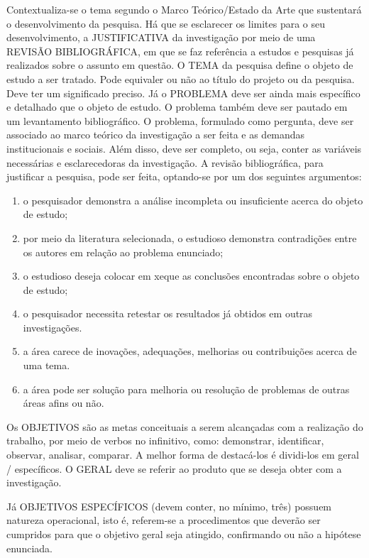 \documentclass[
12pt,				%
openright,			%
oneside,
a4paper,			%
english,			%
french,				%
spanish,			%
brazil,				%
]{abntex2}
\begin{document}
	Contextualiza-se o tema segundo o Marco Teórico/Estado da Arte que sustentará o desenvolvimento da pesquisa. Há que se esclarecer os limites para o seu desenvolvimento, a JUSTIFICATIVA da investigação por meio de uma REVISÃO BIBLIOGRÁFICA, em que se faz referência a estudos e pesquisas já realizados sobre o assunto em questão. O TEMA da pesquisa define o objeto de estudo a ser tratado. Pode equivaler ou não ao título do projeto ou da pesquisa. Deve ter um significado preciso. Já o PROBLEMA deve ser ainda mais específico e detalhado que o objeto de estudo. O problema também deve ser pautado em um levantamento bibliográfico. O problema, formulado como pergunta, deve ser associado ao marco teórico da investigação a ser feita e as demandas institucionais e sociais. Além disso, deve ser completo, ou seja, conter as variáveis necessárias e esclarecedoras da investigação. 
	A revisão bibliográfica, para justificar a pesquisa, pode ser feita, optando-se por um dos seguintes argumentos:
	\begin{enumerate}
		\item o pesquisador demonstra a análise incompleta ou insuficiente acerca do objeto de estudo;
		\item por meio da literatura selecionada, o estudioso demonstra contradições entre os autores em relação ao problema enunciado;
		\item o estudioso deseja colocar em xeque as conclusões encontradas sobre o objeto de estudo;
		\item o pesquisador necessita retestar os resultados já obtidos em outras investigações.
		\item a área carece de inovações, adequações, melhorias ou contribuições acerca de uma tema.
		\item a área pode ser solução para melhoria ou resolução de problemas de outras áreas afins ou não.
	\end{enumerate}
	
	Os OBJETIVOS são as metas conceituais a serem alcançadas com a realização do trabalho, por meio de verbos no infinitivo, como: demonstrar, identificar, observar, analisar, comparar. A melhor forma de destacá-los é dividi-los em geral / específicos. O GERAL deve se referir ao produto que se deseja obter com a investigação. 
	
	Já OBJETIVOS ESPECÍFICOS (devem conter, no mínimo, três) possuem natureza operacional, isto é, referem-se a procedimentos que deverão ser cumpridos para que o objetivo geral seja atingido, confirmando ou não a hipótese enunciada.
	
\end{document}
